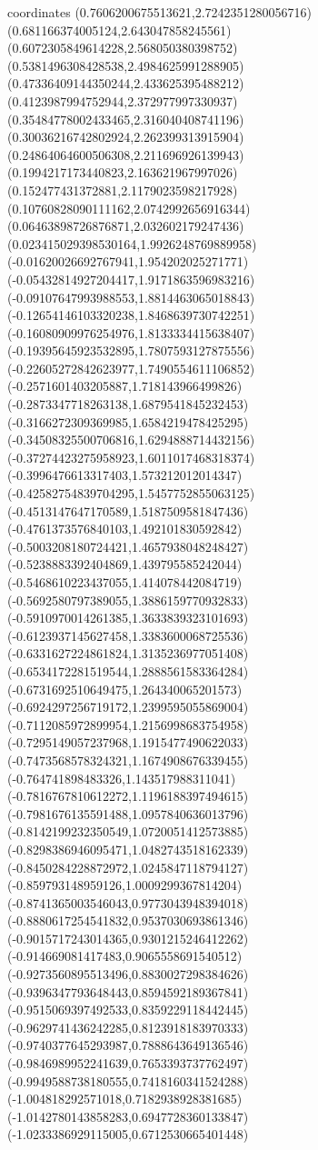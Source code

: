 coordinates {%
(0.7606200675513621,2.7242351280056716)
(0.681166374005124,2.643047858245561)
(0.6072305849614228,2.568050380398752)
(0.5381496308428538,2.4984625991288905)
(0.47336409144350244,2.433625395488212)
(0.4123987994752944,2.372977997330937)
(0.35484778002433465,2.316040408741196)
(0.30036216742802924,2.262399313915904)
(0.24864064600506308,2.211696926139943)
(0.1994217173440823,2.163621967997026)
(0.152477431372881,2.1179023598217928)
(0.10760828090111162,2.0742992656916344)
(0.06463898726876871,2.032602179247436)
(0.023415029398530164,1.9926248769889958)
(-0.01620026692767941,1.954202025271771)
(-0.05432814927204417,1.9171863596983216)
(-0.09107647993988553,1.8814463065018843)
(-0.12654146103320238,1.8468639730742251)
(-0.16080909976254976,1.8133334415638407)
(-0.19395645923532895,1.7807593127875556)
(-0.22605272842623977,1.7490554611106852)
(-0.2571601403205887,1.718143966499826)
(-0.2873347718263138,1.6879541845232453)
(-0.3166272309369985,1.6584219478425295)
(-0.34508325500706816,1.6294888714432156)
(-0.37274423275958923,1.6011017468318374)
(-0.3996476613317403,1.573212012014347)
(-0.42582754839704295,1.5457752855063125)
(-0.4513147647170589,1.5187509581847436)
(-0.4761373576840103,1.492101830592842)
(-0.5003208180724421,1.4657938048248427)
(-0.5238883392404869,1.439795585242044)
(-0.5468610223437055,1.414078442084719)
(-0.5692580797389055,1.3886159770932833)
(-0.5910970014261385,1.3633839323101693)
(-0.6123937145627458,1.3383600068725536)
(-0.6331627224861824,1.3135236977051408)
(-0.6534172281519544,1.2888561583364284)
(-0.6731692510649475,1.264340065201573)
(-0.6924297256719172,1.2399595055869004)
(-0.7112085972899954,1.2156998683754958)
(-0.7295149057237968,1.1915477490622033)
(-0.7473568578324321,1.1674908676339455)
(-0.764741898483326,1.143517988311041)
(-0.7816767810612272,1.1196188397494615)
(-0.7981676135591488,1.0957840636013796)
(-0.8142199232350549,1.0720051412573885)
(-0.8298386946095471,1.0482743518162339)
(-0.8450284228872972,1.0245847118794127)
(-0.859793148959126,1.0009299367814204)
(-0.8741365003546043,0.9773043948394018)
(-0.8880617254541832,0.9537030693861346)
(-0.9015717243014365,0.9301215246412262)
(-0.914669081417483,0.9065558691540512)
(-0.9273560895513496,0.8830027298384626)
(-0.9396347793648443,0.8594592189367841)
(-0.9515069397492533,0.8359229118442445)
(-0.9629741436242285,0.8123918183970333)
(-0.9740377645293987,0.7888643649136546)
(-0.9846989952241639,0.7653393737762497)
(-0.9949588738180555,0.7418160341524288)
(-1.004818292571018,0.7182938928381685)
(-1.0142780143858283,0.6947728360133847)
(-1.0233386929115005,0.6712530665401448)
}
